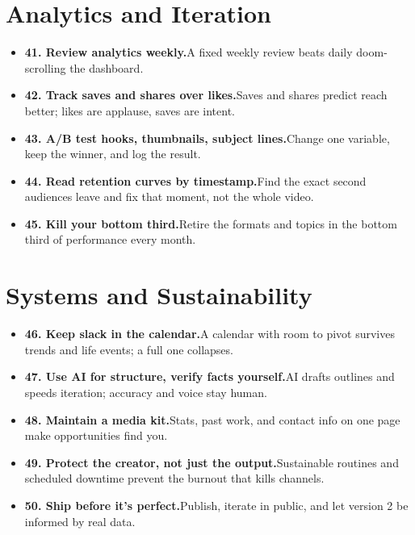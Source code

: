 \documentclass[11pt]{article}
\newcommand{\tip}[2]{\item \textbf{#1.}\enspace #2}
\newcommand{\tlabel}{\textcolor{accent}{\small$\blacktriangleright$}}
\begin{document}
\section*{Analytics and Iteration}
\begin{itemize}[label=\tlabel]
\tip{41. Review analytics weekly}{A fixed weekly review beats daily doom-scrolling the dashboard.}
\tip{42. Track saves and shares over likes}{Saves and shares predict reach better; likes are applause, saves are intent.}
\tip{43. A/B test hooks, thumbnails, subject lines}{Change one variable, keep the winner, and log the result.}
\tip{44. Read retention curves by timestamp}{Find the exact second audiences leave and fix that moment, not the whole video.}
\tip{45. Kill your bottom third}{Retire the formats and topics in the bottom third of performance every month.}
\end{itemize}
\section*{Systems and Sustainability}
\begin{itemize}[label=\tlabel]
\tip{46. Keep slack in the calendar}{A calendar with room to pivot survives trends and life events; a full one collapses.}
\tip{47. Use AI for structure, verify facts yourself}{AI drafts outlines and speeds iteration; accuracy and voice stay human.}
\tip{48. Maintain a media kit}{Stats, past work, and contact info on one page make opportunities find you.}
\tip{49. Protect the creator, not just the output}{Sustainable routines and scheduled downtime prevent the burnout that kills channels.}
\tip{50. Ship before it's perfect}{Publish, iterate in public, and let version 2 be informed by real data.}
\end{itemize}
\end{document}
